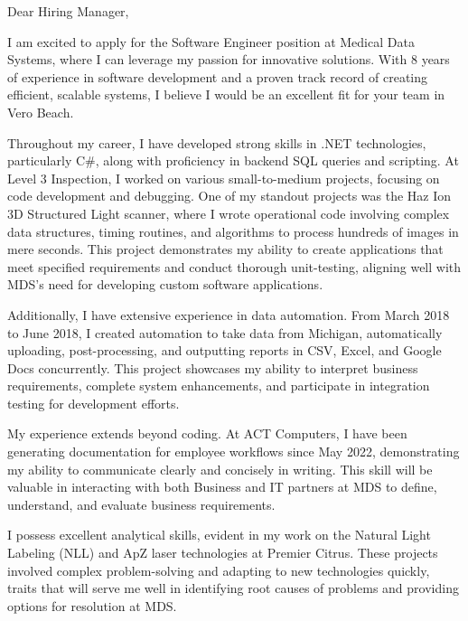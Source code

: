 
Dear Hiring Manager,

\smallskip

I am excited to apply for the Software Engineer position at Medical Data Systems, where I can leverage my passion for innovative solutions.
With 8 years of experience in software development and a proven track record of creating efficient, scalable systems, I believe I would be an excellent fit for your team in Vero Beach.

\smallskip

Throughout my career, I have developed strong skills in .NET technologies, particularly C\#, along with proficiency in backend SQL queries and scripting.
At Level 3 Inspection, I worked on various small-to-medium projects, focusing on code development and debugging.
One of my standout projects was the Haz Ion 3D Structured Light scanner, where I wrote operational code involving complex data structures, timing routines, and algorithms to process hundreds of images in mere seconds.
This project demonstrates my ability to create applications that meet specified requirements and conduct thorough unit-testing, aligning well with MDS's need for developing custom software applications.

\smallskip

Additionally, I have extensive experience in data automation.
From March 2018 to June 2018, I created automation to take data from Michigan, automatically uploading, post-processing, and outputting reports in CSV, Excel, and Google Docs concurrently.
This project showcases my ability to interpret business requirements, complete system enhancements, and participate in integration testing for development efforts.

\smallskip

My experience extends beyond coding.
At ACT Computers, I have been generating documentation for employee workflows since May 2022, demonstrating my ability to communicate clearly and concisely in writing.
This skill will be valuable in interacting with both Business and IT partners at MDS to define, understand, and evaluate business requirements.

\smallskip

I possess excellent analytical skills, evident in my work on the Natural Light Labeling (NLL) and ApZ laser technologies at Premier Citrus.
These projects involved complex problem-solving and adapting to new technologies quickly, traits that will serve me well in identifying root causes of problems and providing options for resolution at MDS.

